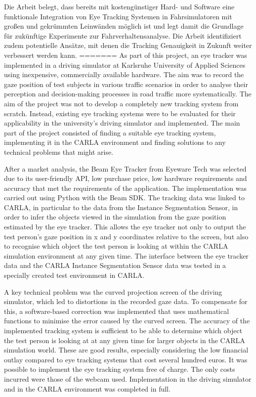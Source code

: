 Die Arbeit belegt, dass bereits mit kostengünstiger Hard- und Software eine funktionale Integration von Eye Tracking Systemen in Fahrsimulatoren mit großen und gekrümmten Leinwänden möglich ist und legt damit die Grundlage für zukünftige Experimente zur Fahrverhaltensanalyse. Die Arbeit identifiziert zudem potentielle Ansätze, mit denen die Tracking Genauigkeit in Zukunft weiter verbessert werden kann.
=======
As part of this project, an eye tracker was implemented in a driving simulator at Karlsruhe University of Applied Sciences using inexpensive, commercially available hardware. The aim was to record the gaze position of test subjects in various traffic scenarios in order to analyse their perception and decision-making processes in road traffic more systematically. The aim of the project was not to develop a completely new tracking system from scratch. Instead, existing eye tracking systems were to be evaluated for their applicability in the university's driving simulator and implemented. The main part of the project consisted of finding a suitable eye tracking system, implementing it in the CARLA environment and finding solutions to any technical problems that might arise. 

After a market analysis, the Beam Eye Tracker from Eyeware Tech was selected due to its user-friendly API, low purchase price, low hardware requirements and accuracy that met the requirements of the application. The implementation was carried out using Python with the Beam SDK. The tracking data was linked to CARLA, in particular to the data from the Instance Segmentation Sensor, in order to infer the objects viewed in the simulation from the gaze position estimated by the eye tracker. This allows the eye tracker not only to output the test person's gaze position in x and y coordinates relative to the screen, but also to recognise which object the test person is looking at within the CARLA simulation environment at any given time. The interface between the eye tracker data and the CARLA Instance Segmentation Sensor data was tested in a specially created test environment in CARLA. 

A key technical problem was the curved projection screen of the driving simulator, which led to distortions in the recorded gaze data. To compensate for this, a software-based correction was implemented that uses mathematical functions to minimise the error caused by the curved screen. The accuracy of the implemented tracking system is sufficient to be able to determine which object the test person is looking at at any given time for larger objects in the CARLA simulation world. These are good results, especially considering the low financial outlay compared to eye tracking systems that cost several hundred euros. It was possible to implement the eye tracking system free of charge. The only costs incurred were those of the webcam used. Implementation in the driving simulator and in the CARLA environment was completed in full.

